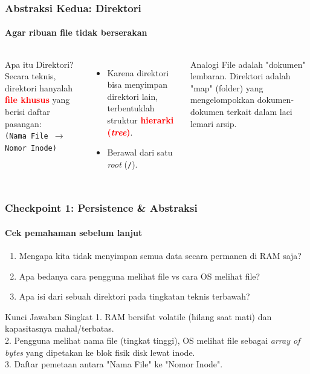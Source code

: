 \documentclass[t,aspectratio=169,xcolor=dvipsnames]{beamer}
\newcommand{\tem}[1]{\textbf{\textcolor{red}{#1}}}
\begin{document}
\begin{frame}
    \frametitle{Abstraksi Kedua: Direktori}
    \framesubtitle{Agar ribuan file tidak berserakan}
    \small

    \begin{columns}[T]
        \begin{block}{Apa itu Direktori?}
            Secara teknis, direktori hanyalah \tem{file khusus} yang berisi daftar pasangan: \\
            \texttt{(Nama File $\to$ Nomor Inode)}
        \end{block}
        
        \begin{itemize}
            \item Karena direktori bisa menyimpan direktori lain, terbentuklah struktur \tem{hierarki (\textit{tree})}.
            \item Berawal dari satu \textit{root} (\texttt{/}).
        \end{itemize}

        \begin{exampleblock}{Analogi}
            File adalah "dokumen" lembaran. Direktori adalah "map" (folder) yang mengelompokkan dokumen-dokumen terkait dalam laci lemari arsip.
        \end{exampleblock}
    \end{columns}
\end{frame}

\begin{frame}
    \frametitle{Checkpoint 1: Persistence \& Abstraksi}
    \framesubtitle{Cek pemahaman sebelum lanjut}
    \small
    \begin{enumerate}
        \item Mengapa kita tidak menyimpan semua data secara permanen di RAM saja?
        \item Apa bedanya cara pengguna melihat file vs cara OS melihat file?
        \item Apa isi dari sebuah direktori pada tingkatan teknis terbawah?
    \end{enumerate}
    \vspace{0.5cm}
    \begin{block}{Kunci Jawaban Singkat}
        1. RAM bersifat volatile (hilang saat mati) dan kapasitasnya mahal/terbatas.\\
        2. Pengguna melihat nama file (tingkat tinggi), OS melihat file sebagai \textit{array of bytes} yang dipetakan ke blok fisik disk lewat inode.\\
        3. Daftar pemetaan antara "Nama File" ke "Nomor Inode".
    \end{block}
\end{frame}
\end{document}
